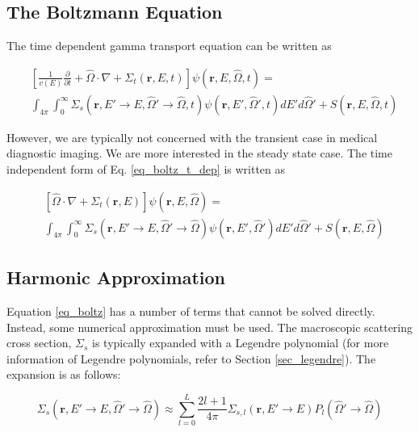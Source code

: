 \documentclass{article}
\numberwithin{equation}{subsection}
\begin{document}
\subsection{The Boltzmann Equation}

The time dependent gamma transport equation can be written as

\begin{equation} \label{eq_boltz_t_dep}
\begin{split}
	&\left[ \frac{1}{v(E)} \frac{\partial}{\partial t} + \hat{\Omega} \cdot \nabla + \Sigma_t(\boldsymbol{r}, E, t) \right]
	\psi(\boldsymbol{r}, E, \hat{\Omega}, t) = \\
	&\int_{4 \pi} \int_0^\infty \Sigma_s(\boldsymbol{r}, E' \rightarrow E, \hat{\Omega}' \rightarrow \hat{\Omega}, t) \psi(\boldsymbol{r}, E', \hat{\Omega}', t) dE' d\hat{\Omega}' + S(\boldsymbol{r}, E, \hat{\Omega}, t)
\end{split}
\end{equation}

However, we are typically not concerned with the transient case in medical diagnostic imaging. We are more interested in the steady state case. The time independent form of Eq. \ref{eq_boltz_t_dep} is written as

\begin{equation} \label{eq_boltz}
\begin{split}
	&\left[ \hat{\Omega} \cdot \nabla + \Sigma_t(\boldsymbol{r}, E) \right]
	\psi(\boldsymbol{r}, E, \hat{\Omega}) = \\
	&\int_{4 \pi} \int_0^\infty \Sigma_s(\boldsymbol{r}, E' \rightarrow E, \hat{\Omega}' \rightarrow \hat{\Omega}) \psi(\boldsymbol{r}, E', \hat{\Omega}') dE' d\hat{\Omega}' + S(\boldsymbol{r}, E, \hat{\Omega})
\end{split}
\end{equation}

\subsection{Harmonic Approximation}
Equation \ref{eq_boltz} has a number of terms that cannot be solved directly. Instead, some numerical approximation must be used. The macroscopic scattering cross section, $\Sigma_s$ is typically expanded with a Legendre polynomial (for more information of Legendre polynomials, refer to Section \ref{sec_legendre}). The expansion is as follows:

\begin{equation} \label{eq_sigma_expansion}
\Sigma_s(\boldsymbol{r}, E' \rightarrow E, \hat{\Omega}' \rightarrow \hat{\Omega}) \approx \sum_{l=0}^L \frac{2l+1}{4 \pi} \Sigma_{s,l}(\boldsymbol{r}, E' \rightarrow E) P_l(\hat{\Omega}' \rightarrow \hat{\Omega})
\end{equation}
\end{document}
